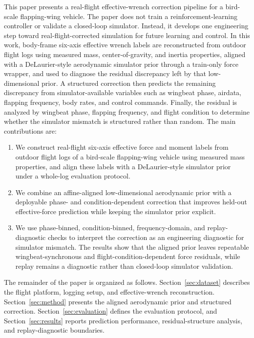 This paper presents a real-flight effective-wrench correction pipeline for a bird-scale flapping-wing vehicle. The paper does not train a reinforcement-learning controller or validate a closed-loop simulator. Instead, it develops one engineering step toward real-flight-corrected simulation for future learning and control. In this work, body-frame six-axis effective wrench labels are reconstructed from outdoor flight logs using measured mass, center-of-gravity, and inertia properties, aligned with a DeLaurier-style aerodynamic simulator prior through a train-only force wrapper, and used to diagnose the residual discrepancy left by that low-dimensional prior. A structured correction then predicts the remaining discrepancy from simulator-available variables such as wingbeat phase, airdata, flapping frequency, body rates, and control commands. Finally, the residual is analyzed by wingbeat phase, flapping frequency, and flight condition to determine whether the simulator mismatch is structured rather than random. The main contributions are:
\begin{enumerate}
  \item We construct real-flight six-axis effective force and moment labels from outdoor flight logs of a bird-scale flapping-wing vehicle using measured mass properties, and align these labels with a DeLaurier-style simulator prior under a whole-log evaluation protocol.
  \item We combine an affine-aligned low-dimensional aerodynamic prior with a deployable phase- and condition-dependent correction that improves held-out effective-force prediction while keeping the simulator prior explicit.
  \item We use phase-binned, condition-binned, frequency-domain, and replay-diagnostic checks to interpret the correction as an engineering diagnostic for simulator mismatch. The results show that the aligned prior leaves repeatable wingbeat-synchronous and flight-condition-dependent force residuals, while replay remains a diagnostic rather than closed-loop simulator validation.
\end{enumerate}

The remainder of the paper is organized as follows. Section~\ref{sec:dataset} describes the flight platform, logging setup, and effective-wrench reconstruction. Section~\ref{sec:method} presents the aligned aerodynamic prior and structured correction. Section~\ref{sec:evaluation} defines the evaluation protocol, and Section~\ref{sec:results} reports prediction performance, residual-structure analysis, and replay-diagnostic boundaries.
